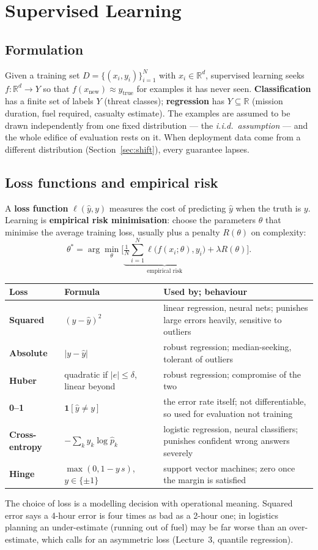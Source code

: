\documentclass[11pt]{article}
\begin{document}
\section{Supervised Learning}
\subsection{Formulation}
Given a training set $D=\{(x_i,y_i)\}_{i=1}^N$ with $x_i\in\mathbb R^d$, supervised learning seeks $f:\mathbb R^d\to Y$ so that $f(x_{\text{new}})\approx y_{\text{true}}$ for examples it has never seen. \textbf{Classification} has a finite set of labels $Y$ (threat classes); \textbf{regression} has $Y\subseteq\mathbb R$ (mission duration, fuel required, casualty estimate). The examples are assumed to be drawn independently from one fixed distribution --- the \emph{i.i.d.\ assumption} --- and the whole edifice of evaluation rests on it. When deployment data come from a different distribution (Section~\ref{sec:shift}), every guarantee lapses.

\subsection{Loss functions and empirical risk}
A \textbf{loss function} $\ell(\hat y,y)$ measures the cost of predicting $\hat y$ when the truth is $y$. Learning is \textbf{empirical risk minimisation}: choose the parameters $\theta$ that minimise the average training loss, usually plus a penalty $R(\theta)$ on complexity:
\[\theta^*=\arg\min_\theta\Big[\underbrace{\tfrac1N\textstyle\sum_{i=1}^N\ell\big(f(x_i;\theta),y_i\big)}_{\text{empirical risk}}+\lambda R(\theta)\Big].\]
\begin{center}\small\renewcommand{\arraystretch}{1.35}
\begin{tabularx}{\textwidth}{>{\bfseries}l l X}\toprule Loss & Formula & Used by; behaviour\\\midrule
Squared & $(y-\hat y)^2$ & linear regression, neural nets; punishes large errors heavily, sensitive to outliers\\
Absolute & $|y-\hat y|$ & robust regression; median-seeking, tolerant of outliers\\
Huber & quadratic if $|e|\le\delta$, linear beyond & robust regression; compromise of the two\\
0--1 & $\mathbf 1[\hat y\ne y]$ & the error rate itself; not differentiable, so used for evaluation not training\\
Cross-entropy & $-\sum_ky_k\log\hat p_k$ & logistic regression, neural classifiers; punishes confident wrong answers severely\\
Hinge & $\max(0,1-y\,s)$, $y\in\{\pm1\}$ & support vector machines; zero once the margin is satisfied\\\bottomrule
\end{tabularx}\end{center}
The choice of loss is a modelling decision with operational meaning. Squared error says a 4-hour error is four times as bad as a 2-hour one; in logistics planning an under-estimate (running out of fuel) may be far worse than an over-estimate, which calls for an asymmetric loss (Lecture~3, quantile regression).
\end{document}
